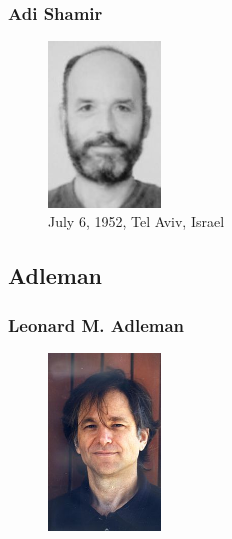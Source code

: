 \documentclass[slidestop,compress,mathserif]{beamer}
\begin{document}
\begin{frame}
  \frametitle{Adi Shamir}
  \begin{multicols}{2}
    \begin{minipage}[c]{0.5\textwidth}
      \begin{figure}[H]
        \includegraphics[width=3cm]{Shamir.jpg}
        \caption{July 6, 1952, Tel Aviv, Israel}
      \end{figure}
    \end{minipage}

  \end{multicols}
  
\end{frame}
\subsection{\hfill Adleman}
\begin{frame}
  \frametitle{Leonard M. Adleman}
  \begin{multicols}{2}
    \begin{figure}
      \includegraphics[width=3cm]{Adleman.jpg}
    \end{figure}
    
  \end{multicols}

\end{frame}
\end{document}
